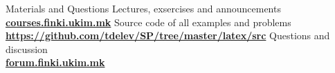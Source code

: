 \begin{frame}{Materials and Questions}{}
    Lectures, exsercises and announcements\\
    \href{http://courses.finki.ukim.mk/}{\textbf{courses.finki.ukim.mk}}
    \vfill
        Source code of all examples and problems\\
    \href{https://github.com/tdelev/SP/tree/master/latex/src}{\textbf{https://github.com/tdelev/SP/tree/master/latex/src}}
    \vfill
        Questions and discussion\\
    \href{http://forum.finki.ukim.mk}{\textbf{forum.finki.ukim.mk}}
\end{frame}

